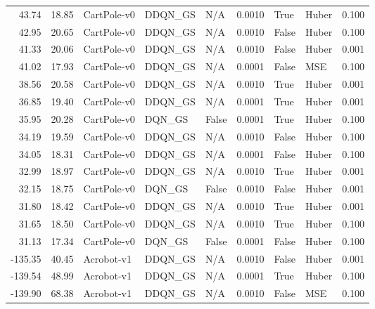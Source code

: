 \begin{tabular}{rrlllrllr}
  43.74 &   18.85 &     CartPole-v0 &  DDQN\_GS &    N/A &  0.0010 &      True &         Huber &         0.100 \\
  42.95 &   20.65 &     CartPole-v0 &  DDQN\_GS &    N/A &  0.0010 &     False &         Huber &         0.100 \\
  41.33 &   20.06 &     CartPole-v0 &  DDQN\_GS &    N/A &  0.0010 &     False &         Huber &         0.001 \\
  41.02 &   17.93 &     CartPole-v0 &  DDQN\_GS &    N/A &  0.0001 &     False &           MSE &         0.100 \\
  38.56 &   20.58 &     CartPole-v0 &  DDQN\_GS &    N/A &  0.0010 &      True &         Huber &         0.001 \\
  36.85 &   19.40 &     CartPole-v0 &  DDQN\_GS &    N/A &  0.0001 &      True &         Huber &         0.001 \\
  35.95 &   20.28 &     CartPole-v0 &   DQN\_GS &  False &  0.0001 &      True &         Huber &         0.100 \\
  34.19 &   19.59 &     CartPole-v0 &  DDQN\_GS &    N/A &  0.0010 &     False &         Huber &         0.100 \\
  34.05 &   18.31 &     CartPole-v0 &  DDQN\_GS &    N/A &  0.0001 &     False &         Huber &         0.100 \\
  32.99 &   18.97 &     CartPole-v0 &  DDQN\_GS &    N/A &  0.0010 &      True &         Huber &         0.001 \\
  32.15 &   18.75 &     CartPole-v0 &   DQN\_GS &  False &  0.0010 &     False &         Huber &         0.001 \\
  31.80 &   18.42 &     CartPole-v0 &  DDQN\_GS &    N/A &  0.0010 &      True &         Huber &         0.001 \\
  31.65 &   18.50 &     CartPole-v0 &  DDQN\_GS &    N/A &  0.0010 &      True &         Huber &         0.100 \\
  31.13 &   17.34 &     CartPole-v0 &   DQN\_GS &  False &  0.0001 &     False &         Huber &         0.100 \\
-135.35 &   40.45 &      Acrobot-v1 &  DDQN\_GS &    N/A &  0.0010 &     False &         Huber &         0.001 \\
-139.54 &   48.99 &      Acrobot-v1 &  DDQN\_GS &    N/A &  0.0001 &      True &         Huber &         0.100 \\
-139.90 &   68.38 &      Acrobot-v1 &  DDQN\_GS &    N/A &  0.0010 &     False &           MSE &         0.100 \\

\end{tabular}
